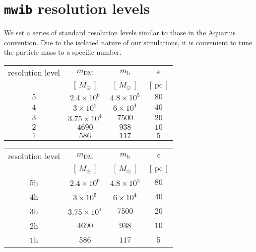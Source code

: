 \documentclass[a4paper,fleqn,usenatbib]{mnras}
\newcommand{\mwib}{\texttt{mwib}}
\begin{document}
\section{\mwib{} resolution levels}
We set a series of standard resolution levels similar to those in the Aquarius
convention. Due to the isolated nature of our simulations, it is convenient to
tune the particle mass to a specific number.

\begin{table}
\begin{tabular}{cccc}
resolution level & $m_{\text{DM}}$      & $m_{\text{b}}$    & $\epsilon$        \\
                 & $[\,M_{\odot}\,]$    & $[\,M_{\odot}\,]$ & $[\,\text{pc}\,]$ \\
$5$              & $2.4\times10^6$      & $4.8\times10^5$   & $80$             \\
$4$              & $3\times10^5$        & $6\times10^4$     & $40$             \\
$3$              & $3.75 \times 10^{4}$ & $7500$            & $20$             \\
$2$              & $4690$               & $938$             & $10$            \\
$1$              & $586$                & $117$             & $5$           
\end{tabular}
\end{table}

\begin{table}
\begin{tabular}{cccc}
resolution level & $m_{\text{DM}}$      & $m_{\text{b}}$    & $\epsilon$        \\
                 & $[\,M_{\odot}\,]$    & $[\,M_{\odot}\,]$ & $[\,\text{pc}\,]$ \\
$5$h             & $2.4\times10^6$      & $4.8\times10^5$   & $80$             \\
$4$h             & $3\times10^5$        & $6\times10^4$     & $40$             \\
$3$h             & $3.75 \times 10^{4}$ & $7500$            & $20$             \\
$2$h             & $4690$               & $938$             & $10$            \\
$1$h             & $586$                & $117$             & $5$           
\end{tabular}
\end{table}




\bsp	%
\label{lastpage}
\end{document}
